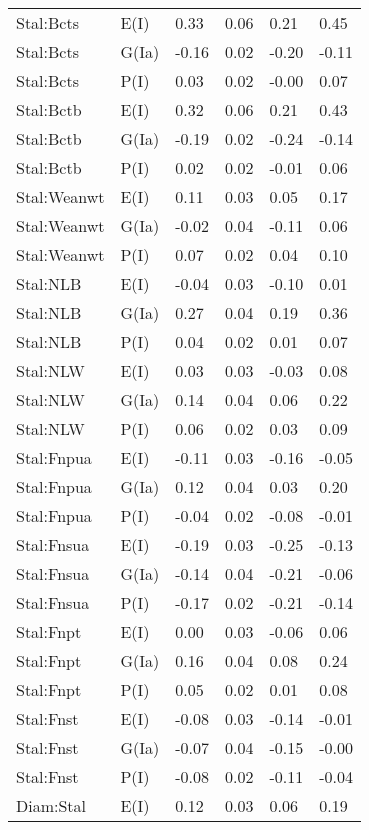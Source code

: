 \begin{center}
\begin{longtable}{|p{1.1in}|p{0.7in}|p{0.7in}|p{0.6in}|p{0.6in}|p{0.6in}|}
  Stal:Bcts & E(I) & 0.33 & 0.06 & 0.21 & 0.45 \\ 
  Stal:Bcts & G(Ia) & -0.16 & 0.02 & -0.20 & -0.11 \\ 
  Stal:Bcts & P(I) & 0.03 & 0.02 & -0.00 & 0.07 \\ 
  Stal:Bctb & E(I) & 0.32 & 0.06 & 0.21 & 0.43 \\ 
  Stal:Bctb & G(Ia) & -0.19 & 0.02 & -0.24 & -0.14 \\ 
  Stal:Bctb & P(I) & 0.02 & 0.02 & -0.01 & 0.06 \\ 
  Stal:Weanwt & E(I) & 0.11 & 0.03 & 0.05 & 0.17 \\ 
  Stal:Weanwt & G(Ia) & -0.02 & 0.04 & -0.11 & 0.06 \\ 
  Stal:Weanwt & P(I) & 0.07 & 0.02 & 0.04 & 0.10 \\ 
  Stal:NLB & E(I) & -0.04 & 0.03 & -0.10 & 0.01 \\ 
  Stal:NLB & G(Ia) & 0.27 & 0.04 & 0.19 & 0.36 \\ 
  Stal:NLB & P(I) & 0.04 & 0.02 & 0.01 & 0.07 \\ 
  Stal:NLW & E(I) & 0.03 & 0.03 & -0.03 & 0.08 \\ 
  Stal:NLW & G(Ia) & 0.14 & 0.04 & 0.06 & 0.22 \\ 
  Stal:NLW & P(I) & 0.06 & 0.02 & 0.03 & 0.09 \\ 
  Stal:Fnpua & E(I) & -0.11 & 0.03 & -0.16 & -0.05 \\ 
  Stal:Fnpua & G(Ia) & 0.12 & 0.04 & 0.03 & 0.20 \\ 
  Stal:Fnpua & P(I) & -0.04 & 0.02 & -0.08 & -0.01 \\ 
  Stal:Fnsua & E(I) & -0.19 & 0.03 & -0.25 & -0.13 \\ 
  Stal:Fnsua & G(Ia) & -0.14 & 0.04 & -0.21 & -0.06 \\ 
  Stal:Fnsua & P(I) & -0.17 & 0.02 & -0.21 & -0.14 \\ 
  Stal:Fnpt & E(I) & 0.00 & 0.03 & -0.06 & 0.06 \\ 
  Stal:Fnpt & G(Ia) & 0.16 & 0.04 & 0.08 & 0.24 \\ 
  Stal:Fnpt & P(I) & 0.05 & 0.02 & 0.01 & 0.08 \\ 
  Stal:Fnst & E(I) & -0.08 & 0.03 & -0.14 & -0.01 \\ 
  Stal:Fnst & G(Ia) & -0.07 & 0.04 & -0.15 & -0.00 \\ 
  Stal:Fnst & P(I) & -0.08 & 0.02 & -0.11 & -0.04 \\ 
  Diam:Stal & E(I) & 0.12 & 0.03 & 0.06 & 0.19 \\ 

\end{longtable}
\end{center}
